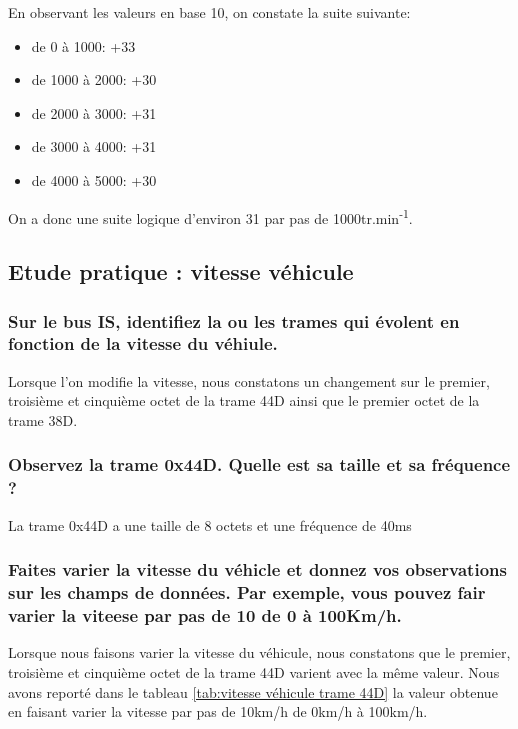 \documentclass{rapportECC}
\begin{document}
En observant les valeurs en base 10, on constate la suite suivante:

\begin{itemize}
    \item de 0 à 1000: +33
    \item de 1000 à 2000: +30
    \item de 2000 à 3000: +31
    \item de 3000 à 4000: +31
    \item de 4000 à 5000: +30
\end{itemize}

On a donc une suite logique d'environ 31 par pas de 1000tr.min\textsuperscript{-1}.


\subsection{Etude pratique : vitesse véhicule}

\subsubsection*{Sur le bus IS, identifiez la ou les trames qui évolent en fonction de la vitesse du véhiule.}

Lorsque l'on modifie la vitesse, nous constatons un changement sur le premier, troisième et cinquième octet de la trame 44D ainsi que le premier octet de la trame 38D.

\subsubsection*{Observez la trame 0x44D. Quelle est sa taille et sa fréquence ?}

La trame 0x44D a une taille de 8 octets et une fréquence de 40ms

\subsubsection*{Faites varier la vitesse du véhicle et donnez vos observations sur les champs de données. Par exemple, vous pouvez fair varier la viteese par pas de 10 de 0 à 100Km/h.}

Lorsque nous faisons varier la vitesse du véhicule, nous constatons que le premier, troisième et cinquième octet de la trame 44D varient avec la même valeur. Nous avons reporté dans le tableau \ref{tab:vitesse véhicule trame 44D} la valeur obtenue en faisant varier la vitesse par pas de 10km/h de 0km/h à 100km/h.
\end{document}
